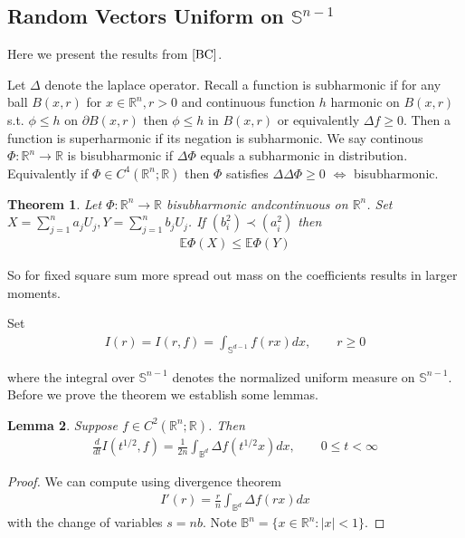 \documentclass[10pt]{article}
\newcommand{\E}{\mathbb{E}}
\newcommand{\1}{\textbf{1}}
\newcommand{\R}{\mathbb{R}}
\newtheorem{theorem}{Theorem}
\newtheorem{lemma}[theorem]{Lemma}
\theoremstyle{remark}
\theoremstyle{definition}
\begin{document}
\subsection{Random Vectors Uniform on $\mathbb{S}^{n-1}$}

Here we present the results from $\cite{BC}$. 

Let $\Delta$ denote the laplace operator. Recall a function is subharmonic if for any ball $B(x,r)$ for $x \in \R^n, r > 0$ and continuous function $h$ harmonic on $B(x,r)$ s.t. $\phi \leq h$ on $\partial B(x,r)$ then $\phi \leq h$ in $B(x,r)$ or equivalently $\Delta f \geq 0$. Then a function is superharmonic if its negation is subharmonic. We say continous $\Phi : \R^n \to \R$ is bisubharmonic if $\Delta \Phi$ equals a subharmonic in distribution. Equivalently if $\Phi \in C^4(\R^n;\R)$ then $\Phi$ satisfies $\Delta \Delta \Phi \geq 0$ $\iff$ bisubharmonic. 

\begin{theorem}
	Let $\Phi : \R^n \to \R$ bisubharmonic andcontinuous on $\R^n$. Set $X = \sum_{j=1}^n a_j U_j, Y = \sum_{j=1}^n b_jU_j$. If $(b_i^2) \prec (a_i^2)$ then 
	\begin{align*}
		\E \Phi(X) \leq \E \Phi(Y)
	\end{align*}
\end{theorem}

So for fixed square sum more spread out mass on the coefficients results in larger moments. 

Set 
\begin{align*}
	I(r) = I(r,f) = \int_{\mathbb{S}^{d-1}} f(rx) dx, \qquad r \geq 0
\end{align*}

where the integral over $\mathbb{S}^{n-1}$ denotes the normalized uniform measure on $\mathbb{S}^{n-1}$. Before we prove the theorem we establish some lemmas.

\begin{lemma}
	Suppose $f \in C^2(\R^n;\R)$. Then
	\begin{align*}
		\frac{d}{dt}I(t^{1/2},f) = \frac{1}{2n}\int_{\mathbb{B}^d}\Delta f(t^{1/2}x)dx, \qquad 0 \leq t < \infty
	\end{align*}
\end{lemma}

\begin{proof}
	We can compute using divergence theorem
	\begin{align*}
		I'(r) = \frac{r}{n}\int_{\mathbb{B}^d} \Delta f(rx)dx
	\end{align*}
	with the change of variables $s=nb$. Note $\mathbb{B}^n = \{x \in \R^n : |x| < 1\}$. 
\end{proof}
\end{document}
